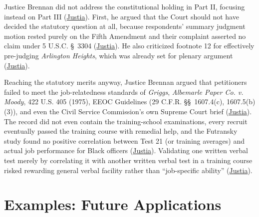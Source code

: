 \documentclass[12pt]{article}
\begin{document}
Justice Brennan did not address the constitutional holding in Part II, focusing instead on Part III (\href{https://supreme.justia.com/cases/federal/us/426/229/}{Justia}). First, he argued that the Court should not have decided the statutory question at all, because respondents' summary judgment motion rested purely on the Fifth Amendment and their complaint asserted no claim under 5 U.S.C. \S~3304 (\href{https://supreme.justia.com/cases/federal/us/426/229/}{Justia}). He also criticized footnote 12 for effectively pre-judging \textit{Arlington Heights}, which was already set for plenary argument (\href{https://supreme.justia.com/cases/federal/us/426/229/}{Justia}).

Reaching the statutory merits anyway, Justice Brennan argued that petitioners failed to meet the job-relatedness standards of \textit{Griggs}, \textit{Albemarle Paper Co. v. Moody}, 422 U.S. 405 (1975), EEOC Guidelines (29 C.F.R. \S\S~1607.4(c), 1607.5(b)(3)), and even the Civil Service Commission's own Supreme Court brief (\href{https://supreme.justia.com/cases/federal/us/426/229/}{Justia}). The record did not even contain the training-school examinations, every recruit eventually passed the training course with remedial help, and the Futransky study found no positive correlation between Test 21 (or training averages) and actual job performance for Black officers (\href{https://supreme.justia.com/cases/federal/us/426/229/}{Justia}). Validating one written verbal test merely by correlating it with another written verbal test in a training course risked rewarding general verbal facility rather than ``job-specific ability'' (\href{https://supreme.justia.com/cases/federal/us/426/229/}{Justia}).

\section{Examples: Future Applications}
\end{document}
